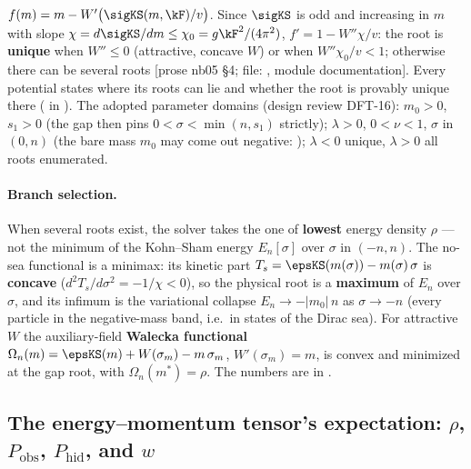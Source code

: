 $f(m)=m-W'\bigl(\sigKS(m,\kF)/v\bigr)$. Since $\sigKS$ is odd and increasing in $m$ with slope
$\chi=d\sigKS/dm\leq\chi_0=g\kF^2/(4\pi^2)$, $f'=1-W''\chi/v$: the root is \textbf{unique} when $W''\leq0$
(attractive, concave $W$) or when $W''\chi_0/v<1$; otherwise there can be several roots [prose nb05 \S4;
file: , module documentation]. Every potential states where its roots can lie and
whether the root is provably unique there ( in ). The
adopted parameter domains (design review DFT-16):  $m_0>0$, $s_1>0$ (the gap then pins
$0<\sigma<\min(n,s_1)$ strictly);  $\lambda>0$, $0<\nu<1$, $\sigma$ in $(0,n)$ (the bare mass
$m_0$ may come out negative: );  $\lambda<0$ unique, $\lambda>0$ all
roots enumerated.

\paragraph{Branch selection.} When several roots exist, the solver takes the one of \textbf{lowest}
energy density $\rho$ --- not the minimum of the Kohn--Sham energy $E_n[\sigma]$ over $\sigma$ in $(-n,n)$.
The no-sea functional is a minimax: its kinetic part $T_s=\epsKS(m(\sigma))-m(\sigma)\,\sigma$ is
\textbf{concave} ($d^2T_s/d\sigma^2=-1/\chi<0$), so the physical root is a \textbf{maximum} of $E_n$ over
$\sigma$, and its infimum is the variational collapse $E_n\to-|m_0|\,n$ as $\sigma\to-n$ (every particle
in the negative-mass band, i.e.\ in states of the Dirac sea). For attractive $W$ the auxiliary-field
\textbf{Walecka functional} $\Omega_n(m)=\epsKS(m)+W(\sigma_m)-m\,\sigma_m$, $W'(\sigma_m)=m$, is convex and
minimized at the gap root, with $\Omega_n(m^*)=\rho$. The numbers are in .

\subsection{The energy--momentum tensor's expectation: \texorpdfstring{$\rho$, $P_{\mathrm{obs}}$, $P_{\mathrm{hid}}$}{rho, P\_obs, P\_hid}, and \texorpdfstring{$w$}{w}}
\label{sec:7.4}

